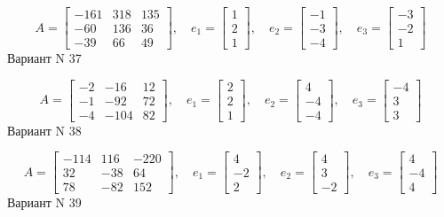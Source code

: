 \documentclass[11pt]{report}
\begin{document}
$$A = \left[\begin{matrix}-161 & 318 & 135\\-60 & 136 & 36\\-39 & 66 & 49\end{matrix}\right],\quad e_1 = \left[\begin{matrix}1\\2\\1\end{matrix}\right],\quad e_2 = \left[\begin{matrix}-1\\-3\\-4\end{matrix}\right],\quad e_3 = \left[\begin{matrix}-3\\-2\\1\end{matrix}\right]$$Вариант N 37

$$A = \left[\begin{matrix}-2 & -16 & 12\\-1 & -92 & 72\\-4 & -104 & 82\end{matrix}\right],\quad e_1 = \left[\begin{matrix}2\\2\\1\end{matrix}\right],\quad e_2 = \left[\begin{matrix}4\\-4\\-4\end{matrix}\right],\quad e_3 = \left[\begin{matrix}-4\\3\\3\end{matrix}\right]$$Вариант N 38

$$A = \left[\begin{matrix}-114 & 116 & -220\\32 & -38 & 64\\78 & -82 & 152\end{matrix}\right],\quad e_1 = \left[\begin{matrix}4\\-2\\2\end{matrix}\right],\quad e_2 = \left[\begin{matrix}4\\3\\-2\end{matrix}\right],\quad e_3 = \left[\begin{matrix}4\\-4\\4\end{matrix}\right]$$Вариант N 39
\end{document}

